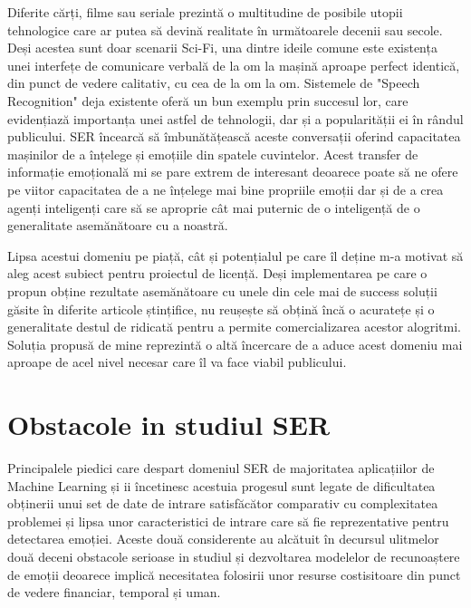 \documentclass[a4paper,12pt]{book}
\begin{document}
					Diferite cărți, filme sau seriale prezintă o multitudine de posibile utopii tehnologice care ar putea să devină realitate în următoarele decenii sau secole. Deși acestea sunt doar scenarii Sci-Fi, una dintre ideile comune este existența unei interfețe de comunicare verbală de la om la mașină aproape perfect identică, din punct de vedere calitativ, cu cea de la om la om. Sistemele de "Speech Recognition" deja existente oferă un bun exemplu prin succesul lor, care evidențiază importanța unei astfel de tehnologii, dar și a popularității ei în rândul publicului. SER încearcă să îmbunătățească aceste conversații oferind capacitatea mașinilor de a înțelege și emoțiile din spatele cuvintelor. Acest transfer de informație emoțională mi se pare extrem de interesant deoarece poate să ne ofere pe viitor capacitatea de a ne înțelege mai bine propriile emoții dar și de a crea agenți inteligenți care să se aproprie cât mai puternic de o inteligență de o generalitate asemănătoare cu a noastră. \par
					
					Lipsa acestui domeniu pe piață, cât și potențialul pe care îl deține m-a motivat să aleg acest subiect pentru proiectul de licență. Deși implementarea pe care o propun obține rezultate asemănătoare cu unele din cele mai de success soluții găsite în diferite articole ștințifice, nu reușește să obțină încă o acuratețe și o  generalitate destul de ridicată pentru a permite comercializarea acestor alogritmi. Soluția propusă de mine reprezintă o altă încercare de a aduce acest domeniu mai aproape de acel nivel necesar care îl va face viabil publicului. \par  
										
			\section{Obstacole in studiul SER}	\label{obstacole}	
			 	Principalele piedici care despart domeniul SER de majoritatea aplicațiilor de Machine Learning și ii încetinesc acestuia progesul sunt legate de dificultatea obținerii unui set de date de intrare satisfăcător comparativ cu complexitatea problemei și lipsa unor caracteristici de intrare care să fie reprezentative pentru detectarea emoției. Aceste două considerente au alcătuit în decursul ulitmelor două deceni obstacole serioase in studiul și dezvoltarea modelelor de recunoaștere de emoții deoarece implică necesitatea folosirii unor resurse costisitoare din punct de vedere financiar, temporal și uman.\par
				
\end{document}
